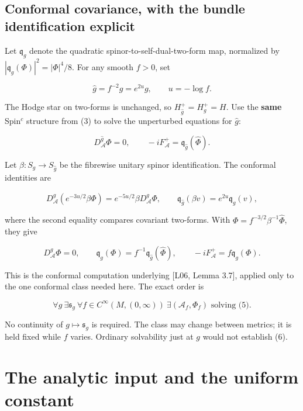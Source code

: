 \documentclass[
  10pt,
]{article}
\begin{document}
\hypertarget{conformal-covariance-with-the-bundle-identification-explicit}{%
\subsection{Conformal covariance, with the bundle identification
explicit}\label{conformal-covariance-with-the-bundle-identification-explicit}}

Let \(\mathfrak q_g\) denote the quadratic spinor-to-self-dual-two-form
map, normalized by \(|\mathfrak q_g(\Phi)|^2=|\Phi|^4/8\). For any
smooth \(f>0\), set

\[
\widehat g=f^{-2}g=e^{2u}g,\qquad u=-\log f.
\]

The Hodge star on two-forms is unchanged, so
\(H_{\widehat g}^+=H_g^+=H\). Use the \textbf{same} Spin\(^c\) structure
from (3) to solve the unperturbed equations for \(\widehat g\):

\[
D_{\mathcal A}^{\widehat g}\widehat\Phi=0,\qquad
-iF_{\mathcal A}^+=\mathfrak q_{\widehat g}(\widehat\Phi).
\]

Let \(\beta:S_g\to S_{\widehat g}\) be the fibrewise unitary spinor
identification. The conformal identities are

\[
D_{\mathcal A}^{\widehat g}(e^{-3u/2}\beta\Phi)
 =e^{-5u/2}\beta D_{\mathcal A}^{g}\Phi,
\qquad
\mathfrak q_{\widehat g}(\beta v)=e^{2u}\mathfrak q_g(v),
\]

where the second equality compares covariant two-forms. With
\(\Phi=f^{-3/2}\beta^{-1}\widehat\Phi\), they give

\[
D_{\mathcal A}^{g}\Phi=0,\qquad
\mathfrak q_g(\Phi)=f^{-1}\mathfrak q_{\widehat g}(\widehat\Phi),
\qquad -iF_{\mathcal A}^+=f\mathfrak q_g(\Phi).           \tag{5}
\]

This is the conformal computation underlying {[}L06, Lemma 3.7{]},
applied only to the one conformal class needed here. The exact order is

\[
\forall g\ \exists\mathfrak s_g\ \forall f\in C^\infty(M,(0,\infty))
\ \exists(\mathcal A_f,\Phi_f)\text{ solving (5)}.       \tag{6}
\]

No continuity of \(g\mapsto\mathfrak s_g\) is required. The class may
change between metrics; it is held fixed while \(f\) varies. Ordinary
solvability just at \(g\) would not establish (6).

\hypertarget{the-analytic-input-and-the-uniform-constant}{%
\section{The analytic input and the uniform
constant}\label{the-analytic-input-and-the-uniform-constant}}
\end{document}

